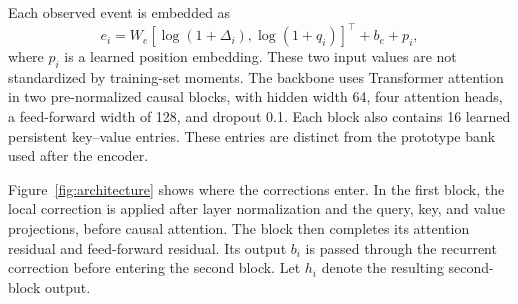 \documentclass[runningheads]{llncs}
\begin{document}
Each observed event is embedded as
\begin{equation}
 e_i=W_e[\log(1+\Delta_i),\log(1+q_i)]^\top+b_e+p_i,
\end{equation}
where $p_i$ is a learned position embedding. These two input values are not standardized by training-set moments. The backbone uses Transformer attention~\cite{vaswani2017attention} in two pre-normalized causal blocks, with hidden width 64, four attention heads, a feed-forward width of 128, and dropout 0.1. Each block also contains 16 learned persistent key--value entries. These entries are distinct from the prototype bank used after the encoder.

Figure~\ref{fig:architecture} shows where the corrections enter. In the first block, the local correction is applied after layer normalization and the query, key, and value projections, before causal attention. The block then completes its attention residual and feed-forward residual. Its output $b_i$ is passed through the recurrent correction before entering the second block. Let $h_i$ denote the resulting second-block output.
\end{document}
